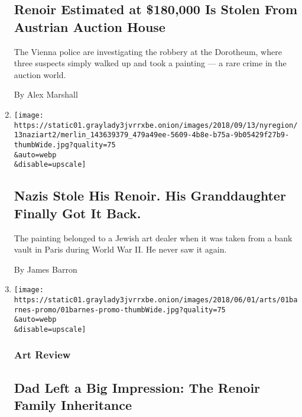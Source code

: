 \begin{enumerate}
  \hypertarget{renoir-estimated-at-180000-is-stolen-from-austrian-auction-house}{%
  \subsection{Renoir Estimated at \$180,000 Is Stolen From Austrian
  Auction
  House}\label{renoir-estimated-at-180000-is-stolen-from-austrian-auction-house}}

  The Vienna police are investigating the robbery at the Dorotheum,
  where three suspects simply walked up and took a painting --- a rare
  crime in the auction world.

  By Alex Marshall
\item
  \href{/2018/09/12/nyregion/nazi-art-renoir.html}{}

  \texttt{[image: https://static01.graylady3jvrrxbe.onion/images/2018/09/13/nyregion/13naziart2/merlin\_143639379\_479a49ee-5609-4b8e-b75a-9b05429f27b9-thumbWide.jpg?quality=75\\\&auto=webp\\\&disable=upscale]}

  \hypertarget{nazis-stole-his-renoir-his-granddaughter-finally-got-it-back}{%
  \subsection{Nazis Stole His Renoir. His Granddaughter Finally Got It
  Back.}\label{nazis-stole-his-renoir-his-granddaughter-finally-got-it-back}}

  The painting belonged to a Jewish art dealer when it was taken from a
  bank vault in Paris during World War II. He never saw it again.

  By James Barron
\item
  \href{/2018/05/30/arts/design/renoir-father-and-son-painting-and-cinema-review-barnes-foundation.html}{}

  \texttt{[image: https://static01.graylady3jvrrxbe.onion/images/2018/06/01/arts/01barnes-promo/01barnes-promo-thumbWide.jpg?quality=75\\\&auto=webp\\\&disable=upscale]}

  \hypertarget{art-review}{%
  \subsubsection{Art Review}\label{art-review}}

  \hypertarget{dad-left-a-big-impression-the-renoir-family-inheritance}{%
  \subsection{Dad Left a Big Impression: The Renoir Family
  Inheritance}\label{dad-left-a-big-impression-the-renoir-family-inheritance}}


\end{enumerate}

